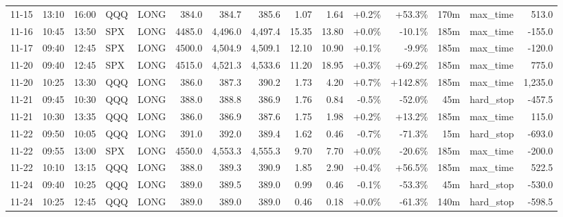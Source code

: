\documentclass[11pt,a4paper,twoside]{article}
\begin{document}
\begin{landscape}
\begin{center}
\begin{longtable}{>{\color{txtmain}}l l l l l r r r r r r r r >{\color{txtmain}}l r}
11-15 & 13:10 & 16:00 & QQQ & LONG & 384.0 & 384.7 & 385.6 & 1.07 & 1.64 & \textcolor{wingreen}{+0.2\%} & \textcolor{wingreen}{+53.3\%} & 170m & max\_time & \textcolor{wingreen}{513.0} \\
11-16 & 10:45 & 13:50 & SPX & LONG & 4485.0 & 4,496.0 & 4,497.4 & 15.35 & 13.80 & \textcolor{wingreen}{+0.0\%} & \textcolor{lossred}{-10.1\%} & 185m & max\_time & \textcolor{lossred}{-155.0} \\
11-17 & 09:40 & 12:45 & SPX & LONG & 4500.0 & 4,504.9 & 4,509.1 & 12.10 & 10.90 & \textcolor{wingreen}{+0.1\%} & \textcolor{lossred}{-9.9\%} & 185m & max\_time & \textcolor{lossred}{-120.0} \\
11-20 & 09:40 & 12:45 & SPX & LONG & 4515.0 & 4,521.3 & 4,533.6 & 11.20 & 18.95 & \textcolor{wingreen}{+0.3\%} & \textcolor{wingreen}{+69.2\%} & 185m & max\_time & \textcolor{wingreen}{775.0} \\
11-20 & 10:25 & 13:30 & QQQ & LONG & 386.0 & 387.3 & 390.2 & 1.73 & 4.20 & \textcolor{wingreen}{+0.7\%} & \textcolor{wingreen}{+142.8\%} & 185m & max\_time & \textcolor{wingreen}{1,235.0} \\
11-21 & 09:45 & 10:30 & QQQ & LONG & 388.0 & 388.8 & 386.9 & 1.76 & 0.84 & \textcolor{lossred}{-0.5\%} & \textcolor{lossred}{-52.0\%} & 45m & hard\_stop & \textcolor{lossred}{-457.5} \\
11-21 & 10:30 & 13:35 & QQQ & LONG & 386.0 & 386.9 & 387.6 & 1.75 & 1.98 & \textcolor{wingreen}{+0.2\%} & \textcolor{wingreen}{+13.2\%} & 185m & max\_time & \textcolor{wingreen}{115.0} \\
11-22 & 09:50 & 10:05 & QQQ & LONG & 391.0 & 392.0 & 389.4 & 1.62 & 0.46 & \textcolor{lossred}{-0.7\%} & \textcolor{lossred}{-71.3\%} & 15m & hard\_stop & \textcolor{lossred}{-693.0} \\
11-22 & 09:55 & 13:00 & SPX & LONG & 4550.0 & 4,553.3 & 4,555.3 & 9.70 & 7.70 & \textcolor{wingreen}{+0.0\%} & \textcolor{lossred}{-20.6\%} & 185m & max\_time & \textcolor{lossred}{-200.0} \\
11-22 & 10:10 & 13:15 & QQQ & LONG & 388.0 & 389.3 & 390.9 & 1.85 & 2.90 & \textcolor{wingreen}{+0.4\%} & \textcolor{wingreen}{+56.5\%} & 185m & max\_time & \textcolor{wingreen}{522.5} \\
11-24 & 09:40 & 10:25 & QQQ & LONG & 389.0 & 389.5 & 389.0 & 0.99 & 0.46 & \textcolor{lossred}{-0.1\%} & \textcolor{lossred}{-53.3\%} & 45m & hard\_stop & \textcolor{lossred}{-530.0} \\
11-24 & 10:25 & 12:45 & QQQ & LONG & 389.0 & 389.0 & 389.0 & 0.46 & 0.18 & \textcolor{wingreen}{+0.0\%} & \textcolor{lossred}{-61.3\%} & 140m & hard\_stop & \textcolor{lossred}{-598.5} \\

\end{longtable}
\end{center}
\end{landscape}
\end{document}
